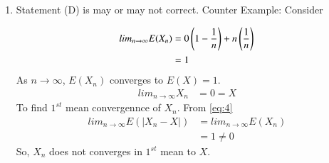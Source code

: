 \documentclass[journal,12pt,twocolumn]{IEEEtran}
\theoremstyle{remark}
\begin{document}
\begin{enumerate}[label=(\Alph*)]
\item Statement (D) is may or may not correct.
Counter Example:
Consider 
\begin{table}[!ht]
	
\end{table}
\begin{align}
lim_{n \to \infty} E(X_n)&=0\left(1-\frac{1}{n}\right)+n\left(\frac{1}{n}\right)\\
&=1\label{eq:4}
\end{align}
As $n \to \infty$, $E(X_n)$ converges to $E(X)=1$.
\begin{align}
lim_{n \to \infty} X_n&=0=X
\end{align}
To find $1^{st}$ mean convergennce of $X_n$. From \eqref{eq:4}
\begin{align}
lim_{n \to \infty} E(|X_n-X|)&=lim_{n \to \infty} E(X_n)\\
&=1 \ne 0
\end{align}
So, $X_n$ does not converges in $1^{st}$ mean to $X$.
\end{enumerate}
\end{document}
